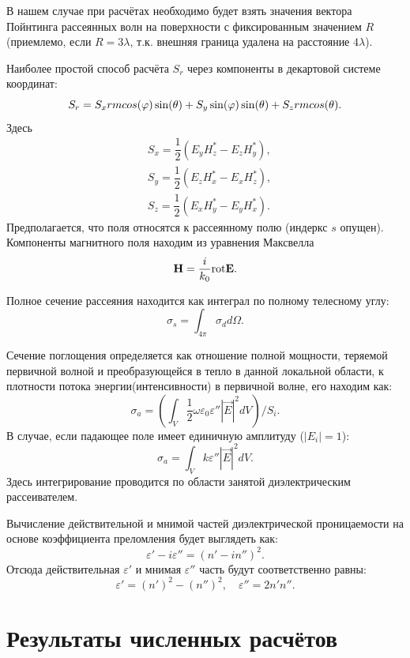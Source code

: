 В нашем случае при расчётах необходимо будет взять значения вектора Пойнтинга рассеянных волн на поверхности с фиксированным значением $R$ (приемлемо, если $R=3\lambda$, т.к. внешняя граница удалена на расстояние $4\lambda$).

Наиболее простой способ расчёта $S_r$ через компоненты в декартовой системе координат:
\begin{equation}
{S}_r = S_x \\rm cos(\varphi)\sin(\theta) + S_y \sin(\varphi)\sin(\theta) + S_z \\rm cos(\theta).
\end{equation}
Здесь
\begin{eqnarray}
& S_x = \dfrac{1}{2} \left(E_y H_z^* - E_z H_y^*\right),\nonumber\\
& S_y = \dfrac{1}{2} \left(E_z H_x^* - E_x H_z^*\right),\nonumber\\ & S_z = \dfrac{1}{2} \left(E_x H_y^* - E_y H_x^*\right).
\end{eqnarray}
Предполагается, что поля относятся к рассеянному полю (индеркс $s$ опущен).
Компоненты магнитного поля находим из уравнения Максвелла
\begin{equation}
{\vec H} = \dfrac{i}{k_0} {\rm \rm rot} \vec{E}.
\end{equation}

Полное сечение рассеяния находится как интеграл по полному телесному углу:
\begin{equation}
\sigma_s = \int_{4\pi} \sigma_d d\Omega.
\end{equation}

Сечение поглощения определяется как отношение полной мощности, теряемой первичной волной и преобразующейся в тепло в данной локальной области, к плотности потока энергии(интенсивности) в первичной волне, его находим как:
\begin{equation}
\sigma_a = \left(\int_V \dfrac{1}{2}\omega\varepsilon_0\varepsilon''|{\vec E}|^2 d V\right)/S_i.
\end{equation}
В случае, если падающее поле имеет единичную амплитуду ($|E_i|=1$):
\begin{equation}
\sigma_a = \int_V k \varepsilon''|{\vec E}|^2 d V.
\end{equation}
Здесь интегрирование проводится по области занятой диэлектрическим рассеивателем.

Вычисление действительной и мнимой частей диэлектрической проницаемости на основе коэффициента преломления будет выглядеть как:
\begin{equation}
\varepsilon' - i \varepsilon'' = (n'-i n'')^2.
\end{equation}
Отсюда действительная $ \varepsilon' $ и мнимая $ \varepsilon'' $ часть будут соответственно равны:
\begin{equation}
\varepsilon' = (n')^2 - (n'')^2,\quad \varepsilon'' = 2 n'n''.
\end{equation}

\section{Результаты численных расчётов}


